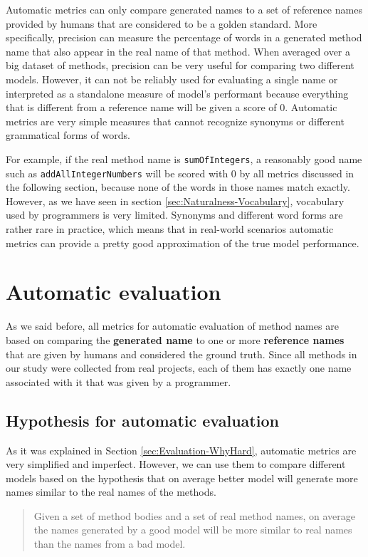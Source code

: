 Automatic metrics can only compare generated names to a set of reference names provided by humans that are considered to be a golden standard. More specifically, precision can measure the percentage of words in a generated method name that also appear in the real name of that method. When averaged over a big dataset of methods, precision can be very useful for comparing two different models. However, it can not be reliably used for evaluating a single name or interpreted as a standalone measure of model's performant because everything that is different from a reference name will be given a score of $0$. Automatic metrics are very simple measures that cannot recognize synonyms or different grammatical forms of words.

For example, if the real method name is \texttt{sumOfIntegers}, a reasonably good name such as \texttt{addAllIntegerNumbers} will be scored with 0 by all metrics discussed in the following section, because none of the words in those names match exactly. However, as we have seen in section \ref{sec:Naturalness-Vocabulary}, vocabulary used by programmers is very limited. Synonyms and different word forms are rather rare in practice, which means that in real-world scenarios automatic metrics can provide a pretty good approximation of the true model performance.

\section{Automatic evaluation}

As we said before, all metrics for automatic evaluation of method names are based on comparing the \textbf{generated name} to one or more \textbf{reference names} that are given by humans and considered the ground truth. Since all methods in our study were collected from real projects, each of them has exactly one name associated with it that was given by a programmer.

\subsection{Hypothesis for automatic evaluation}

As it was explained in Section \ref{sec:Evaluation-WhyHard}, automatic metrics are very simplified and imperfect. However, we can use them to compare different models based on the hypothesis that on average better model will generate more names similar to the real names of the methods.

\begin{quote}
Given a set of method bodies and a set of real method names, on average the names generated by a good model will be more similar to real names than the names from a bad model.
\end{quote}

